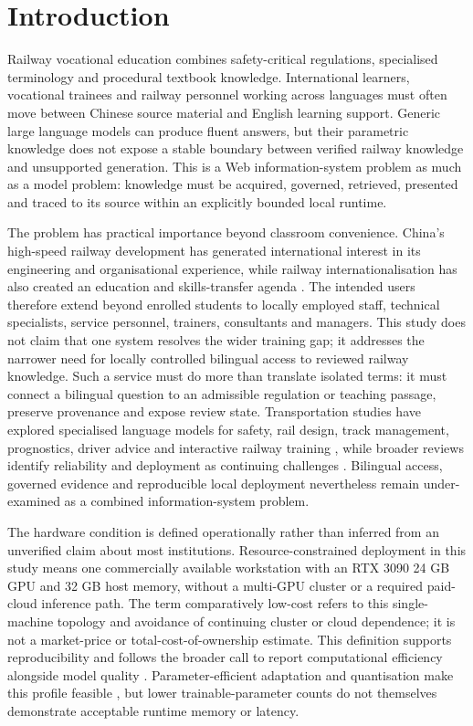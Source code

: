 \section{Introduction}

Railway vocational education combines safety-critical regulations, specialised terminology and procedural textbook knowledge. International learners, vocational trainees and railway personnel working across languages must often move between Chinese source material and English learning support. Generic large language models can produce fluent answers, but their parametric knowledge does not expose a stable boundary between verified railway knowledge and unsupported generation. This is a Web information-system problem as much as a model problem: knowledge must be acquired, governed, retrieved, presented and traced to its source within an explicitly bounded local runtime.

The problem has practical importance beyond classroom convenience. China's high-speed railway development has generated international interest in its engineering and organisational experience, while railway internationalisation has also created an education and skills-transfer agenda \citep{lawrence2019hsr,xu2018education}. The intended users therefore extend beyond enrolled students to locally employed staff, technical specialists, service personnel, trainers, consultants and managers. This study does not claim that one system resolves the wider training gap; it addresses the narrower need for locally controlled bilingual access to reviewed railway knowledge. Such a service must do more than translate isolated terms: it must connect a bilingual question to an admissible regulation or teaching passage, preserve provenance and expose review state. Transportation studies have explored specialised language models for safety, rail design, track management, prognostics, driver advice and interactive railway training \citep{zheng2023trafficsafety,lahnalampi2024rail,wang2024phm,song2025railway,luo2025driver,li2025training}, while broader reviews identify reliability and deployment as continuing challenges \citep{wandelt2024transport}. Bilingual access, governed evidence and reproducible local deployment nevertheless remain under-examined as a combined information-system problem.

The hardware condition is defined operationally rather than inferred from an unverified claim about most institutions. Resource-constrained deployment in this study means one commercially available workstation with an RTX 3090 24 GB GPU and 32 GB host memory, without a multi-GPU cluster or a required paid-cloud inference path. The term comparatively low-cost refers to this single-machine topology and avoidance of continuing cluster or cloud dependence; it is not a market-price or total-cost-of-ownership estimate. This definition supports reproducibility and follows the broader call to report computational efficiency alongside model quality \citep{schwartz2020green}. Parameter-efficient adaptation and quantisation make this profile feasible \citep{dettmers2023qlora,ding2023peft,lv2024full,wang2025peft}, but lower trainable-parameter counts do not themselves demonstrate acceptable runtime memory or latency.

